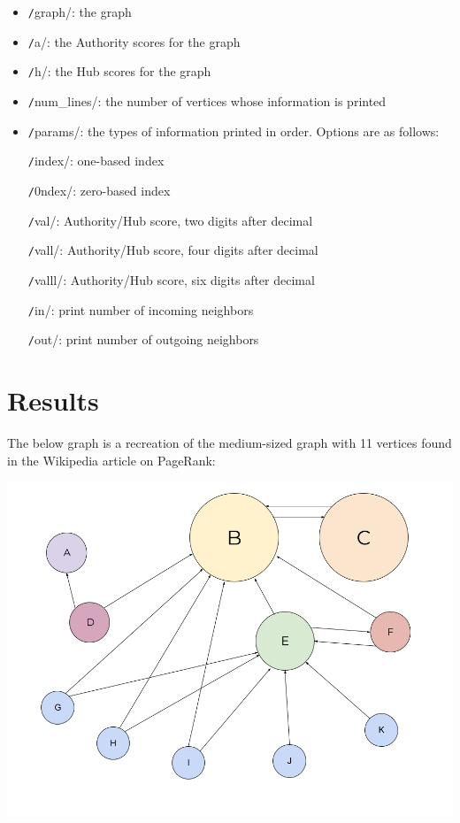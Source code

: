 \documentclass[12pt, titlepage, twoside]{amsart}
\begin{document}
\begin{itemize}[label={}]
\item \texttt/graph/: the graph

\item \texttt/a/: the Authority scores for the graph

\item \texttt/h/: the Hub scores for the graph

\item \texttt/num_lines/: the number of vertices whose information is printed

\item \texttt/params/: the types of information printed in order. Options are as follows:

\texttt/index/: one-based index

\texttt/0ndex/: zero-based index

\texttt/val/: Authority/Hub score, two digits after decimal

\texttt/vall/: Authority/Hub score, four digits after decimal

\texttt/valll/: Authority/Hub score, six digits after decimal

\texttt/in/: print number of incoming neighbors

\texttt/out/: print number of outgoing neighbors
\end{itemize}

\section{Results}

The below graph is a recreation of the medium-sized graph with 11 vertices
found in the Wikipedia article on PageRank:

\includegraphics[width=\textwidth]{Wikipedia_Medium-graph.png}
\end{document}

